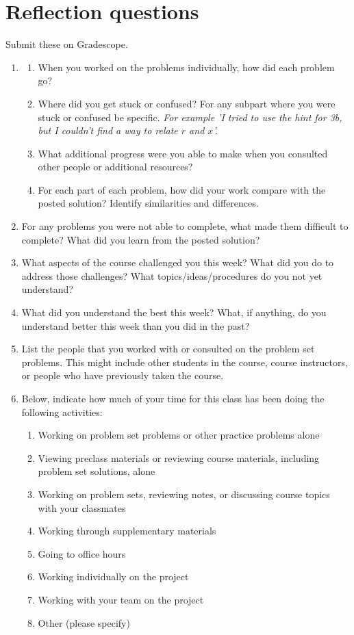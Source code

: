 \documentclass[12pt,letterpaper,answers]{exam}
\begin{document}



\section*{Reflection questions}
Submit these on Gradescope.
\begin{enumerate}
\item \begin{enumerate}
    \itemsep0pt
    \item When you worked on the problems individually, how did each problem go?
    \item Where did you get stuck or confused?  For any subpart where you were stuck or confused be specific.  \emph{For example 'I tried to use the hint for 3b, but I couldn't find a way to relate $r$ and $x$'.}
    \item What additional progress were you able to make when you consulted other people or additional resources?
    \item For each part of each problem, how did your work compare with the posted solution?  Identify similarities and differences.
\end{enumerate}  
\item For any problems you were not able to complete, what made them difficult to complete?  What did you learn from the posted solution?
\item What aspects of the course challenged you this week?  What did you do to address those challenges?  What topics/ideas/procedures do you not yet understand?
\item What did you understand the best this week?  What, if anything, do you understand better this week than you did in the past?
\item List the people that you worked with or consulted on the problem set problems.  This might include other students in the course, course instructors, or people who have previously taken the course.
\item Below, indicate how much of your time for this class has been doing the following activities:
	\begin{enumerate}
	\item Working on problem set problems or other practice problems alone
	\item Viewing preclass materials or reviewing course materials, including problem set solutions, alone
	\item Working on problem sets, reviewing notes, or discussing course topics with your classmates
	\item Working through supplementary materials
	\item Going to office hours
    \item Working individually on the project
    \item Working with your team on the project
	\item Other (please specify)
	\end{enumerate}

\end{enumerate}
\end{document}

